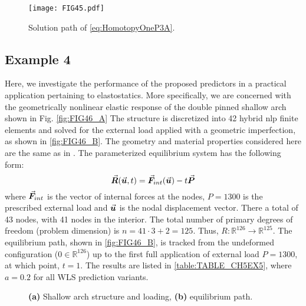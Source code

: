 \begin{figure}[b]
	\centering
	\texttt{[image: FIG45.pdf]}
	\caption{Solution path of \ref{eq:HomotopyOneP3A}.}
	\label{fig:FIG45}
\end{figure}
\clearpage

\subsection*{Example 4}
Here, we investigate the performance of the proposed predictors in a
practical application pertaining to elastostatics. More specifically, we are
concerned with the geometrically nonlinear elastic response of the double pinned
shallow arch shown in Fig. \ref{fig:FIG46_A} The structure is
discretized into 42 hybrid \acrshort{nlp} finite elements and solved for the 
external load
applied with a geometric imperfection, as shown in \ref{fig:FIG46_B}. The 
geometry and material properties 
considered here are the same as in \cite{Clarke:1990}. The parameterized 
equilibrium system has the following form:
\begin{equation}
	\vec{\bm{R}}(\vec{\bm{u}},t)=\vec{\bm{F}}_{int}(\vec{\bm{u}})-t \vec{\bm{P}}
	\label{eq:P4}
\end{equation}
where $\vec{\bm{F}}_{int}$ is the vector of internal forces at the nodes, $P=1300$ 
is the
prescribed external load and $\vec{\bm{u}}$ is the nodal
displacement vector. There a total of 43 nodes, with 41 nodes in the interior. 
The total number of primary degrees of
freedom (problem dimension) is $n=41\cdot 3+2=125$. Thus,
$R:\mathbb{R}^{126}\rightarrow\mathbb{R}^{125}$. The equilibrium path, shown in
\ref{fig:FIG46_B}, is tracked from
the undeformed configuration ($0\in\mathbb{R}^{126}$) up to the first full 
application of external load $P=1300$, at which point, $t=1$. The results are
listed in \ref{table:TABLE_CH5EX5}, where $a=0.2$ for all WLS prediction 
variants. 

\begin{figure*}[t]
	\centering
	\qquad
	\caption{\textbf{(a)} Shallow arch structure and loading, \textbf{(b)}
		equilibrium path.}%
	\label{fig:FIG64}%
\end{figure*}


